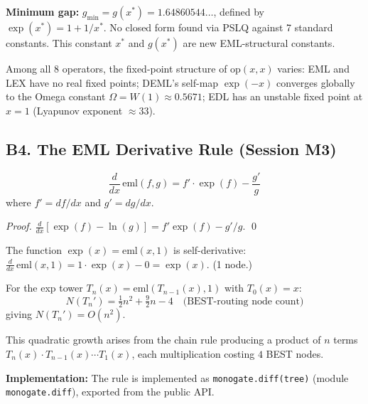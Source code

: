 \textbf{Minimum gap:} $g_{\min} = g(x^*) = 1.64860544\ldots$, defined by
$\exp(x^*) = 1 + 1/x^*$. No closed form found via PSLQ against 7 standard
constants. This constant $x^*$ and $g(x^*)$ are new EML-structural constants.

\begin{remark}
Among all 8 operators, the fixed-point structure of $\mathrm{op}(x,x)$ varies:
EML and LEX have no real fixed points;
DEML's self-map $\exp(-x)$ converges globally to the Omega constant
$\Omega = W(1) \approx 0.5671$;
EDL has an unstable fixed point at $x=1$ (Lyapunov exponent $\approx 33$).
\end{remark}

\subsection*{B4. The EML Derivative Rule (Session M3)}

\begin{proposition}
\[
  \frac{d}{dx}\,\mathrm{eml}(f,g) = f' \cdot \exp(f) - \frac{g'}{g}
\]
where $f' = df/dx$ and $g' = dg/dx$.
\end{proposition}

\begin{proof}
$\frac{d}{dx}[\exp(f) - \ln(g)] = f'\exp(f) - g'/g$. \qed
\end{proof}

\begin{corollary}
The function $\exp(x) = \mathrm{eml}(x, 1)$ is self-derivative:
$\frac{d}{dx}\,\mathrm{eml}(x,1) = 1 \cdot \exp(x) - 0 = \exp(x)$. (1 node.)
\end{corollary}

\begin{proposition}
For the exp tower $T_n(x) = \mathrm{eml}(T_{n-1}(x), 1)$ with $T_0(x) = x$:
\[
  N(T_n') = \tfrac{1}{2}n^2 + \tfrac{9}{2}n - 4 \quad\text{(BEST-routing node count)}
\]
giving $N(T_n') = O(n^2)$.
\end{proposition}

This quadratic growth arises from the chain rule producing a product of $n$ terms
$T_n(x) \cdot T_{n-1}(x) \cdots T_1(x)$, each multiplication costing $4$ BEST nodes.

\textbf{Implementation:} The rule is implemented as \texttt{monogate.diff(tree)}
(module \texttt{monogate.diff}), exported from the public API.


